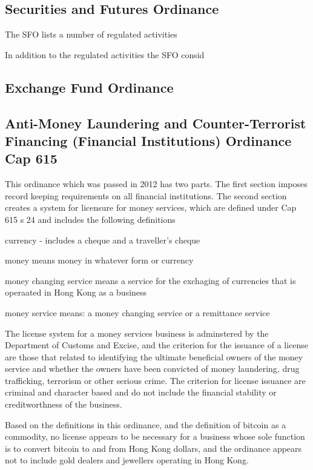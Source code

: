 \subsection{Securities and Futures Ordinance}

The SFO lists a number of regulated activities

In addition to the regulated activities the SFO consid



\subsection{Exchange Fund Ordinance}

\subsection{Anti-Money Laundering and Counter-Terrorist Financing
(Financial Institutions) Ordinance Cap 615}

This ordinance which was passed in 2012 has two parts.  The first
section imposes record keeping requirements on all financial
institutions.  The second section creates a system for licensure for
money services, which are defined under Cap 615 s 24 and includes the
following definitions

currency - includes a cheque and a traveller's cheque

money means money in whatever form or currency

money changing service means a service for the exchaging of currencies
that is operaated in Hong Kong as a business 

money service means: a money changing service or a remittance service

The license system for a money services business is adminstered by the
Department of Customs and Excise, and the criterion for the issuance
of a license are those that related to identifying the ultimate
beneficial owners of the money service and whether the owners have
been convicted of money laundering, drug trafficking, terrorism or
other serious crime.  The criterion for license issuance are criminal
and character based and do not include the financial stability or
creditworthness of the business.

Based on the definitions in this ordinance, and the definition of
bitcoin as a commodity, no license appears to be necessary for a
business whose sole function is to convert bitcoin to and from Hong
Kong dollars, and the ordinance appears not to include gold dealers
and jewellers operating in Hong Kong.

